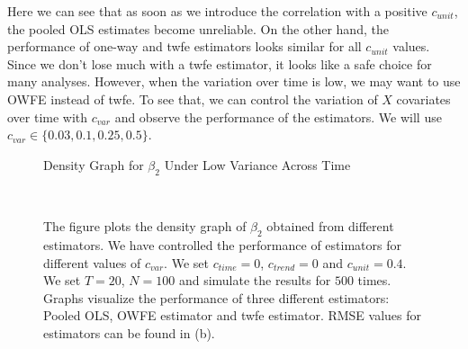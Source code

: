 \documentclass[12pt, a4paper]{article}
\begin{document}
Here we can see that as soon as we introduce the correlation with a positive
 $c_{unit}$, the pooled OLS estimates become unreliable. On the other hand,
 the performance of one-way and  \ac{twfe} estimators looks similar
 for all $c_{unit}$ values. Since we don't lose much with a  \ac{twfe}
 estimator, it looks like a safe choice for many analyses. However, when the
 variation over time is low, we may want to use \ac{OWFE} instead of  \ac{twfe}.
 To see that, we can control the variation of $X$ covariates over time with $c_{var}$ and
 observe the performance of the estimators. We will use $c_{var} \in \{0.03, 0.1, 0.25, 0.5\}$.
\begin{figure}[htbp]
    \caption{Density Graph for $\beta_2$ Under Low Variance Across Time}
     \\
    \caption*{\scriptsize{The figure plots the density graph of $\beta_2$
    obtained from different estimators. We have controlled the performance of
    estimators for different values of $c_{var}$. We set $c_{time} = 0$, $c_{trend} = 0$
    and $c_{unit} = 0.4$. We set $T = 20$, $N = 100$ and simulate the results
    for $500$ times. Graphs visualize the performance
    of three different estimators: Pooled OLS, \ac{OWFE} estimator and  \ac{twfe} estimator.
    RMSE values for estimators can be found in  (b).
    \label{fig:c2}
    }}
\end{figure}
\end{document}
